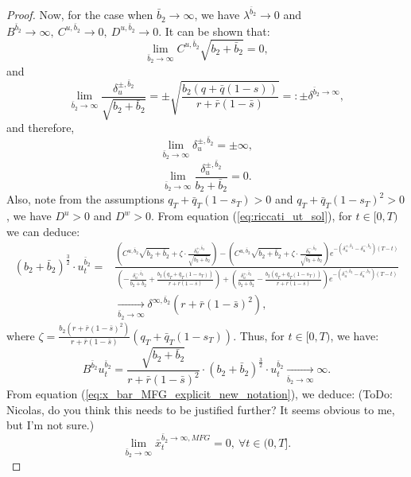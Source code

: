 \documentclass[11pt]{article}
\begin{document}
\begin{proof}
	Now, for the case when $\bar{b}_2 \to \infty$,  we have $\lambda^{\bar{b}_2} \to 0$
	and $B^{\bar{b}_2} \to \infty,\ C^{u,\bar{b}_2} \to 0,\ D^{u,\bar{b}_2} \to 0$. It can be shown that:
	$$\lim_{\bar{b}_2 \to \infty}C^{u,\bar{b}_2}\sqrt{b_2+\bar{b}_2}=0,$$
	and
	$$ \lim_{\bar{b}_2 \to \infty} \frac{\delta^{\pm,\bar{b}_2}_u}{\sqrt{b_2 + \bar{b}_2}} =\pm \sqrt{ \frac{b_2 (q + \bar{q}(1-s))}{r + \bar{r}(1-\bar{s})} } =: \pm \delta^{\bar{b}_2 \to \infty},$$
	and therefore,
	$$\lim_{\bar{b}_2 \to \infty} \delta^{\pm,\bar{b}_2}_u=\pm \infty,$$
	$$\lim_{\bar{b}_2 \to \infty} \frac{\delta^{\pm,\bar{b}_2}_u}{b_2 + \bar{b}_2}=0.$$
	Also, note from the assumptions $q_T+\bar{q}_T(1-s_T)>0$ and $q_T+\bar{q}_T(1-s_T)^2>0$, we have $D^u>0$ and $D^w>0$. From equation (\ref{eq:riccati_ut_sol}), for $t \in [0,T)$ we can deduce:
	\begin{equation*}
	\begin{split}
	 	(b_2 + \bar{b}_2)^{\frac{3}{2}}\cdot u^{\bar{b}_2}_t =& \frac{ \left( C^{u,\bar{b}_2}\sqrt{b_2 + \bar{b}_2} + \zeta \cdot \frac{\delta^{+,\bar{b}_2}_u}{\sqrt{b_2 + \bar{b}_2}}  \right) - \left( C^{u,\bar{b}_2}\sqrt{b_2 + \bar{b}_2} + \zeta \cdot \frac{\delta^{-,\bar{b}_2}_u}{\sqrt{b_2 + \bar{b}_2}}  \right) e^{- (\delta^{+,\bar{b}_2}_u - \delta^{-,\bar{b}_2}_u)(T-t)}}{ \left(- \frac{\delta^{-,\bar{b}_2}_u}{b_2 + \bar{b}_2} + \frac{b_2 (q_T + \bar{q}_T (1-s_T) )}{r + \bar{r}(1-\bar{s})} \right) + \left( \frac{\delta^{+,\bar{b}_2}_u}{b_2 + \bar{b}_2} - \frac{b_2 (q_T + \bar{q}_T (1-s_T) )}{r + \bar{r}(1-\bar{s})} \right)e^{- (\delta^{+,\bar{b}_2}_u - \delta^{-,\bar{b}_2}_u)(T-t)} }\\
	 	& \xrightarrow[\bar{b}_2 \to \infty]{} \delta^{\infty, \bar{b}_2} (r + \bar{r}(1-\bar{s})^2) ,
	 \end{split} 
	\end{equation*}
	where $\zeta = \frac{b_2 (r + \bar{r}(1-\bar{s})^2) }{r+ \bar{r}(1-\bar{s})} (q_T + \bar{q}_T(1-s_T))$. 
	Thus, for $t \in [0,T)$, we have:
	\begin{equation*}
	B^{\bar{b}_2} u^{\bar{b}_2}_t=\frac{\sqrt{b_2+\bar{b}_2}}{r+\bar{r}(1-\bar{s})^2} \cdot (b_2 + \bar{b}_2)^{\frac{3}{2}}\cdot u^{\bar{b}_2}_t \xrightarrow[\bar{b}_2 \to \infty]{}\infty.
	\end{equation*}
	From equation (\ref{eq:x_bar_MFG_explicit_new_notation}), we deduce: (ToDo: Nicolas, do you think this needs to be justified further? It seems obvious to me, but I'm not sure.)
	$$\lim_{\bar{b}_2 \to \infty} \bar{x}_t^{\bar{b}_2 \to \infty,MFG} = 0,\ \forall t \in (0,T]. $$	

\end{proof}
\end{document}
